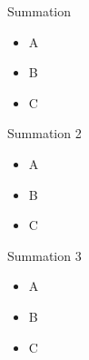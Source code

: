 \begin{frame}{Summation}
    \begin{itemize}
        \item A
        \item B
        \item C
    \end{itemize}
\end{frame}

\begin{frame}{Summation 2}
    \begin{itemize}
        \item A
        \item B
        \item C
    \end{itemize}
\end{frame}

\begin{frame}{Summation 3}
    \begin{itemize}
        \item A
        \item B
        \item C
    \end{itemize}
\end{frame}